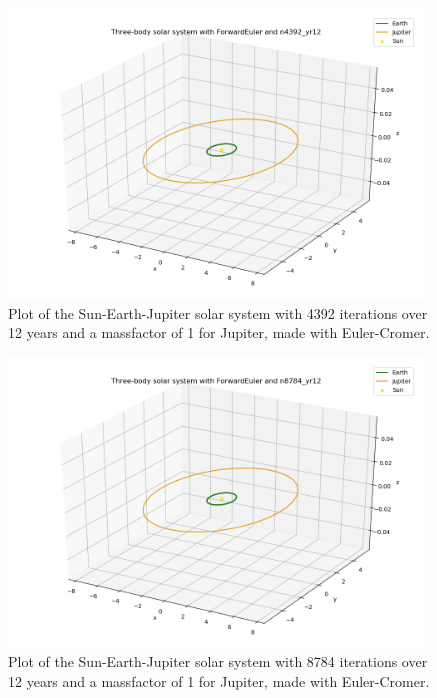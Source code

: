 \documentclass{article}
\begin{document}
    \begin{figure}[H]
        \centering
        \includegraphics[width = 11cm]{img/plot3D_S_E_J_F_n4392_yr12.png}
        \caption{Plot of the Sun-Earth-Jupiter solar system with 4392 iterations over 12 years and a massfactor of 1 for Jupiter, made with Euler-Cromer.}
        \label{fig:plot3D_S_E_J_F_n4392_yr12}
    \end{figure}

    \begin{figure}[H]
        \centering
        \includegraphics[width = 11cm]{img/plot3D_S_E_J_F_n8784_yr12.png}
        \caption{Plot of the Sun-Earth-Jupiter solar system with 8784 iterations over 12 years and a massfactor of 1 for Jupiter, made with Euler-Cromer.}
        \label{fig:plot3D_S_E_J_F_n8784_yr12}
    \end{figure}
\end{document}
